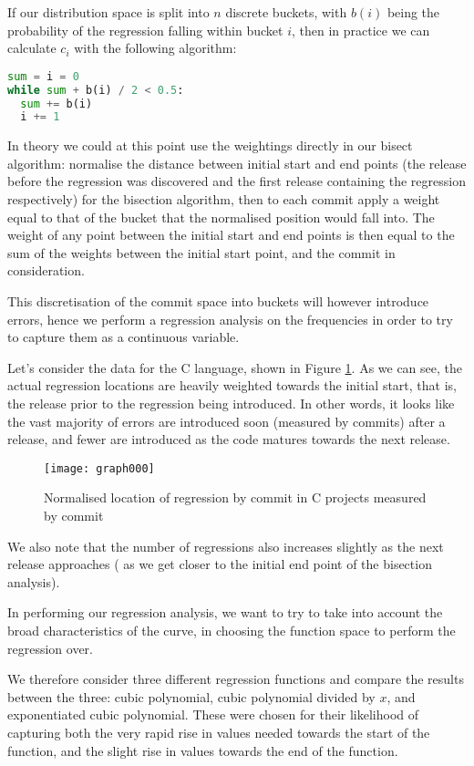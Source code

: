 \documentclass[10pt,journal,compsoc]{IEEEtran}
\begin{document}
If our distribution space is split into $n$ discrete buckets, with $b(i)$ being the probability of the regression falling within bucket $i$, then in practice we can calculate $c_i$ with the following algorithm:

\begin{lstlisting}[language=Python]
sum = i = 0
while sum + b(i) / 2 < 0.5:
  sum += b(i)
  i += 1
\end{lstlisting}

In theory we could at this point use the weightings directly in our bisect algorithm: normalise the distance between initial start and end points (the release before the regression was discovered and the first release containing the regression respectively) for the bisection algorithm, then to each commit apply a weight equal to that of the bucket that the normalised position would fall into. The weight of any point between the initial start and end points is then equal to the sum of the weights between the initial start point, and the commit in consideration.

This discretisation of the commit space into buckets will however introduce errors, hence we perform a regression analysis on the frequencies in order to try to capture them as a continuous variable.

Let's consider the data for the C language, shown in Figure \ref{fig:c-commits}. As we can see, the actual regression locations are heavily weighted towards the initial start, that is, the release prior to the regression being introduced. In other words, it looks like the vast majority of errors are introduced soon (measured by commits) after a release, and fewer are introduced as the code matures towards the next release.

\begin{figure}[t]
\centering
\texttt{[image: graph000]}%
\caption{\label{fig:c-commits}Normalised location of regression by commit in C projects measured by commit}
\end{figure}

We also note that the number of regressions also increases slightly as the next release approaches (\ie\/ as we get closer to the initial end point of the bisection analysis).

In performing our regression analysis, we want to try to take into account the broad characteristics of the curve, in choosing the function space to perform the regression over.

We therefore consider three different regression functions and compare the results between the three: cubic polynomial, cubic polynomial divided by $x$, and exponentiated cubic polynomial. These were chosen for their likelihood of capturing both the very rapid rise in values needed towards the start of the function, and the slight rise in values towards the end of the function.
\end{document}
